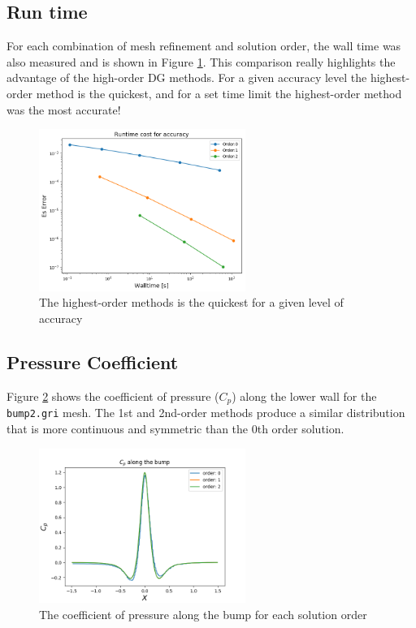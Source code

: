 \documentclass{article}
\begin{document}
\subsection{Run time}
For each combination of mesh refinement and solution order, the wall time was also measured and is shown in Figure \ref{fig:walltime}.
This comparison really highlights the advantage of the high-order DG methods.
For a given accuracy level the highest-order method is the quickest, and for a set time limit the highest-order method was the most accurate!

\begin{figure}[H]
	\centering
	\includegraphics[width=0.60\textwidth,keepaspectratio]{walltime.png}
	\caption{The highest-order methods is the quickest for a given level of accuracy}
	\label{fig:walltime}
\end{figure}





\subsection{Pressure Coefficient}
Figure \ref{fig:cp} shows the coefficient of pressure ($C_p$) along the lower wall for the \texttt{bump2.gri} mesh.
The 1st and 2nd-order methods produce a similar distribution that is more continuous and symmetric than the 0th order solution.

\begin{figure}[H]
	\centering
	\includegraphics[width=0.60\textwidth,keepaspectratio]{cp.png}
	\caption{The coefficient of pressure along the bump for each solution order}
	\label{fig:cp}
\end{figure}
\end{document}
